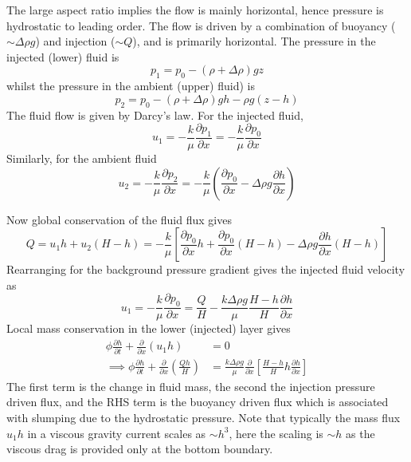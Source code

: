 \documentclass{jknotes}
\begin{document}
The large aspect ratio implies the flow is mainly horizontal, hence pressure
is hydrostatic to leading order. The flow is driven by a combination of
buoyancy ($\sim \Delta \rho g$) and injection ($\sim Q$), and is primarily
horizontal. The pressure in the injected (lower) fluid is
\begin{equation}
	p_1 = p_0 - (\rho + \Delta \rho)gz
\end{equation}
whilst the pressure in the ambient (upper) fluid) is
\begin{equation}
	p_2 = p_0 - (\rho + \Delta \rho) gh - \rho g (z-h)
\end{equation}
The fluid flow is given by Darcy's law. For the injected fluid,
\begin{equation}
	u_1 = -\frac{k}{\mu} \frac{\partial p_1}{\partial x} = -\frac{k}{\mu}
	\frac{\partial p_0}{\partial x}
\end{equation}
Similarly, for the ambient fluid
\begin{equation}
	u_2 = -\frac{k}{\mu} \frac{\partial p_2}{\partial x} = -\frac{k}{\mu}
	\left( \frac{\partial p_0}{\partial x} - \Delta \rho g \frac{\partial
	h}{\partial x} \right)
\end{equation}

Now global conservation of the fluid flux gives
\begin{equation}
	Q = u_1 h + u_2 (H-h) = -\frac{k}{\mu} \left[ \frac{\partial p_0}{\partial
	x} h + \frac{\partial p_0}{\partial x}(H-h) - \Delta \rho g \frac{\partial
h}{\partial x} (H-h)\right]
\end{equation}
Rearranging for the background pressure gradient gives the injected fluid
velocity as
\begin{equation}
	u_1 = -\frac{k}{\mu} \frac{\partial p_0}{\partial x} = \frac{Q}{H} -
	\frac{k\Delta \rho g}{\mu} \frac{H-h}{H} \frac{\partial h}{\partial x}
\end{equation}
Local mass conservation in the lower (injected) layer gives
\begin{align}
	\phi \frac{\partial h}{\partial t} + \frac{\partial}{\partial x}(u_1 h) &=
	0 \label{eq:l6:masscons}\\
	\implies \phi \frac{\partial h}{\partial t} + \frac{\partial}{\partial
x}(\frac{Qh}{H}) &= \frac{k\Delta \rho g}{\mu} \frac{\partial}{\partial x}
\left[ \frac{H-h}{H} h \frac{\partial h}{\partial x}\right]
\end{align}
The first term is the change in fluid mass, the second the injection pressure
driven flux, and the RHS term is the buoyancy driven flux which is associated
with slumping due to the hydrostatic pressure. Note that typically the mass
flux $u_1 h$ in a viscous gravity current scales as $\sim h^3$, here the
scaling is $\sim h$ as the viscous drag is provided only at the bottom
boundary.
\end{document}
